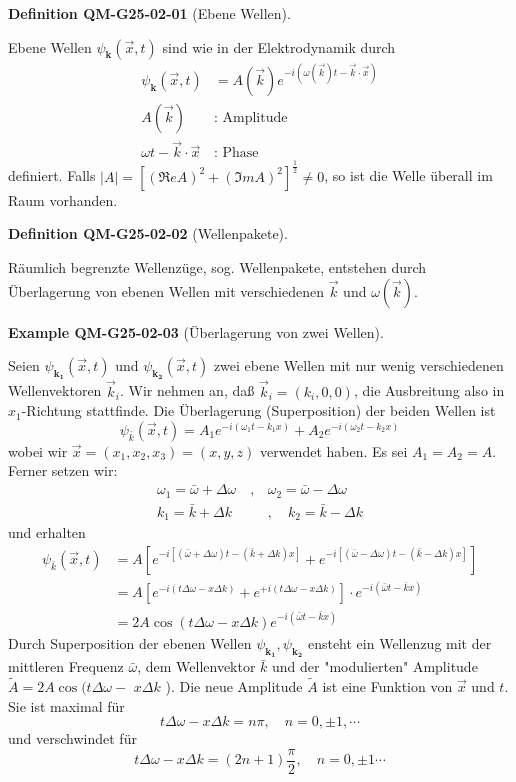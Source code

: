 \documentclass[10pt, letterpaper]{article}
\newcommand{\CustomHeading}[3]{%
  \par\medskip\noindent%
  \textbf{#1 #2} \textnormal{(#3)}.\enskip%
}
\newenvironment{DEF}[2]{\CustomHeading{Definition}{#1}{#2}}{}
\newenvironment{EXA}[2]{\CustomHeading{Example}{#1}{#2}}{}
\begin{document}
\begin{DEF}{QM-G25-02-01}{Ebene Wellen}
Ebene Wellen $\psi_{\mathbf{k}}(\vec{x}, t)$ sind wie in der Elektrodynamik durch
$$
\begin{aligned}
\psi_{\mathbf{k}}(\vec{x}, t) & =A(\vec{k}) e^{-i(\omega(\vec{k}) t-\vec{k} \cdot \vec{x})} \\
A(\vec{k}) & : \text { Amplitude } \\
\omega t-\vec{k} \cdot \vec{x} & : \text { Phase }
\end{aligned}
$$
definiert. Falls $|A|=\left[(\Re e A)^{2}+(\Im m A)^{2}\right]^{\frac{1}{2}} \neq 0$, so ist die Welle überall im Raum vorhanden.
\end{DEF}

\begin{DEF}{QM-G25-02-02}{Wellenpakete}
Räumlich begrenzte Wellenzüge, sog. Wellenpakete, entstehen durch Überlagerung von ebenen Wellen mit verschiedenen $\vec{k}$ und $\omega(\vec{k})$.
\end{DEF}

\begin{EXA}{QM-G25-02-03}{Überlagerung von zwei Wellen}
Seien $\psi_{\mathbf{k}_{\mathbf{1}}}(\vec{x}, t)$ und $\psi_{\mathbf{k}_{\mathbf{2}}}(\vec{x}, t)$ zwei ebene Wellen mit nur wenig verschiedenen Wellenvektoren $\vec{k}_{i}$. Wir nehmen an, daß $\vec{k}_{i}=\left(k_{i}, 0,0\right)$, die Ausbreitung also in $x_{1}$-Richtung stattfinde. Die Überlagerung (Superposition) der beiden Wellen ist
$$
\psi_{\bar{k}}(\vec{x}, t)=A_{1} e^{-i\left(\omega_{1} t-k_{1} x\right)}+A_{2} e^{-i\left(\omega_{2} t-k_{2} x\right)}
$$
wobei wir $\vec{x}=\left(x_{1}, x_{2}, x_{3}\right)=(x, y, z)$ verwendet haben. Es sei $A_{1}=A_{2}=A$. Ferner setzen wir:
$$
\begin{array}{cc}
\omega_{1}=\bar{\omega}+\Delta \omega \quad, & \omega_{2}=\bar{\omega}-\Delta \omega \\
k_{1}=\bar{k}+\Delta k & , \quad k_{2}=\bar{k}-\Delta k
\end{array}
$$
und erhalten
$$
\begin{aligned}
\psi_{\bar{k}}(\vec{x}, t) & =A\left[e^{-i[(\bar{\omega}+\Delta \omega) t-(\bar{k}+\Delta k) x]}+e^{-i[(\bar{\omega}-\Delta \omega) t-(\bar{k}-\Delta k) x]}\right] \\
& =A\left[e^{-i(t \Delta \omega-x \Delta k)}+e^{+i(t \Delta \omega-x \Delta k)}\right] \cdot e^{-i(\bar{\omega} t-\bar{k} x)} \\
& =2 A \cos (t \Delta \omega-x \Delta k) e^{-i(\bar{\omega} t-\bar{k} x)}
\end{aligned}
$$
Durch Superposition der ebenen Wellen $\psi_{\mathbf{k}_{\mathbf{1}}}, \psi_{\mathbf{k}_{\mathbf{2}}}$ ensteht ein Wellenzug mit der mittleren Frequenz $\bar{\omega}$, dem Wellenvektor $\bar{k}$ und der "modulierten" Amplitude $\tilde{A}=2 A \cos (t \Delta \omega-$ $x \Delta k$ ). Die neue Amplitude $\tilde{A}$ ist eine Funktion von $\vec{x}$ und $t$. Sie ist maximal für
$$
t \Delta \omega-x \Delta k=n \pi, \quad n=0, \pm 1, \cdots
$$
und verschwindet für
$$
t \Delta \omega-x \Delta k=(2 n+1) \frac{\pi}{2}, \quad n=0, \pm 1 \cdots
$$
\end{EXA}
\end{document}
